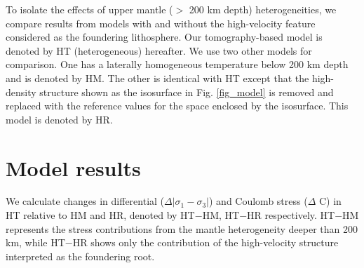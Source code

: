 \documentclass[draft,linenumbers]{agujournal2018}
\begin{document}
To isolate the effects of upper mantle ($>$ 200 km depth) heterogeneities, we compare results from models with and without the high-velocity feature considered as the foundering lithosphere. Our tomography-based model is denoted by HT (heterogeneous) hereafter. We use two other models for comparison. One has a laterally homogeneous temperature below 200 km depth and is denoted by HM. The other is identical with HT except that the high-density structure shown as the isosurface in Fig. \ref{fig_model} is removed and replaced with the reference values for the space enclosed by the isosurface. This model is denoted by HR.

\section{Model results}
We calculate changes in differential ($\Delta|\sigma_1 - \sigma_3|$) and Coulomb stress ($\Delta$ C) in HT relative to HM and HR, denoted by HT$-$HM, HT$-$HR respectively. HT$-$HM represents the stress contributions from the mantle heterogeneity deeper than 200 km, while HT$-$HR shows only the contribution of the high-velocity structure interpreted as the foundering root. 
\end{document}
